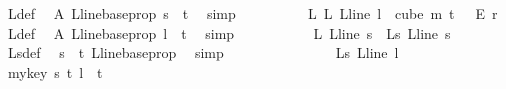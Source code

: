 \begin{isabellebody}
\ {\isasymchi}L{\isacharunderscore}{\kern0pt}def\ \isamarkupfalse%
\ A\ L{\isacharunderscore}{\kern0pt}line{\isacharunderscore}{\kern0pt}base{\isacharunderscore}{\kern0pt}prop\ {\isacartoucheopen}s\ {\isacharless}{\kern0pt}\ t{\isacartoucheclose}\ \isamarkupfalse%
\ simp\isanewline
\ \ \ \ \ \ \ \ \isamarkupfalse%
\ L{}{\isacharcolon}{\kern0pt}\ {\isachardoublequoteopen}{\isasymchi}L\ {\isacharparenleft}{\kern0pt}L{\isacharunderscore}{\kern0pt}line\ l{\isacharparenright}{\kern0pt}\ {\isasymin}\ cube\ m\ {\isacharparenleft}{\kern0pt}t\ {\isacharplus}{\kern0pt}\ {}{\isacharparenright}{\kern0pt}\ {\isasymrightarrow}\isactrlsub E\ {\isacharbraceleft}{\kern0pt}{\isachardot}{\kern0pt}{\isachardot}{\kern0pt}{\isacharless}{\kern0pt}r{\isacharbraceright}{\kern0pt}{\isachardoublequoteclose}\ \isamarkupfalse%
\ {\isasymchi}L{\isacharunderscore}{\kern0pt}def\ \isamarkupfalse%
\ A\ L{\isacharunderscore}{\kern0pt}line{\isacharunderscore}{\kern0pt}base{\isacharunderscore}{\kern0pt}prop\ {\isacartoucheopen}l\ {\isacharless}{\kern0pt}\ t{\isacartoucheclose}\ \isamarkupfalse%
\ simp\isanewline
\ \ \ \ \ \ \ \ \isamarkupfalse%
\ {\isachardoublequoteopen}{\isasymphi}\ {\isacharparenleft}{\kern0pt}{\isasymchi}L\ {\isacharparenleft}{\kern0pt}L{\isacharunderscore}{\kern0pt}line\ s{\isacharparenright}{\kern0pt}{\isacharparenright}{\kern0pt}\ {\isacharequal}{\kern0pt}\ {\isasymchi}L{\isacharunderscore}{\kern0pt}s\ {\isacharparenleft}{\kern0pt}L{\isacharunderscore}{\kern0pt}line\ s{\isacharparenright}{\kern0pt}{\isachardoublequoteclose}\ \isamarkupfalse%
\ {\isasymchi}L{\isacharunderscore}{\kern0pt}s{\isacharunderscore}{\kern0pt}def\ \isamarkupfalse%
\ {\isacartoucheopen}s\ {\isacharless}{\kern0pt}\ t{\isacartoucheclose}\ L{\isacharunderscore}{\kern0pt}line{\isacharunderscore}{\kern0pt}base{\isacharunderscore}{\kern0pt}prop\ \isamarkupfalse%
\ simp\isanewline
\ \ \ \ \ \ \ \ \isamarkupfalse%
\ \isamarkupfalse%
\ {\isachardoublequoteopen}\ {\isachardot}{\kern0pt}{\isachardot}{\kern0pt}{\isachardot}{\kern0pt}\ {\isacharequal}{\kern0pt}\ \ {\isasymchi}L{\isacharunderscore}{\kern0pt}s\ {\isacharparenleft}{\kern0pt}L{\isacharunderscore}{\kern0pt}line\ l{\isacharparenright}{\kern0pt}{\isachardoublequoteclose}\ \isamarkupfalse%
\ mykey\ {\isacartoucheopen}s\ {\isacharless}{\kern0pt}t{\isacartoucheclose}\ {\isacartoucheopen}l\ {\isacharless}{\kern0pt}\ t{\isacartoucheclose}\ \isamarkupfalse%

\end{isabellebody}
